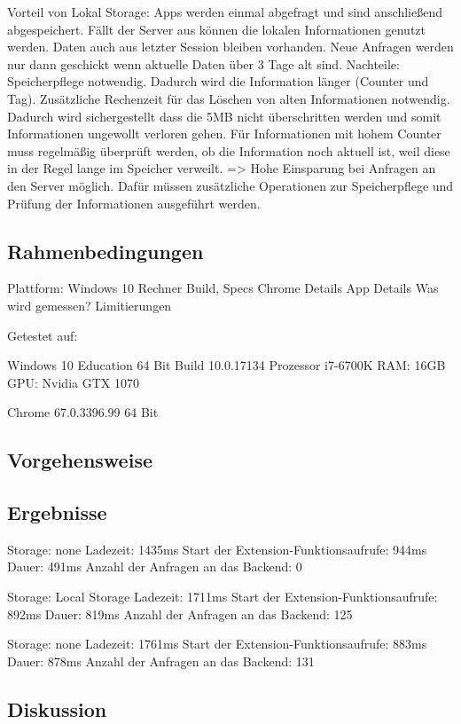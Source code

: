 Vorteil von Lokal Storage: Apps werden einmal abgefragt und sind anschließend abgespeichert. Fällt der Server aus können die lokalen Informationen genutzt werden. Daten auch aus letzter Session bleiben vorhanden. Neue Anfragen werden nur dann geschickt wenn aktuelle Daten über 3 Tage alt sind.
Nachteile: Speicherpflege notwendig. Dadurch wird die Information länger (Counter und Tag). Zusätzliche Rechenzeit für das Löschen von alten Informationen notwendig. Dadurch wird sichergestellt dass die 5MB nicht überschritten werden und somit Informationen ungewollt verloren gehen. Für Informationen mit hohem Counter muss regelmäßig überprüft werden, ob die Information noch aktuell ist, weil diese in der Regel lange im Speicher verweilt.
=> Hohe Einsparung bei Anfragen an den Server möglich. Dafür müssen zusätzliche Operationen zur Speicherpflege und Prüfung der Informationen ausgeführt werden.

\subsection{Rahmenbedingungen}
\label{ss:rahmenbedingungen}

Plattform: Windows 10 Rechner Build, Specs
Chrome Details
App Details
Was wird gemessen?
Limitierungen

Getestet auf:

Windows 10 Education 64 Bit
Build 10.0.17134
Prozessor i7-6700K
RAM: 16GB
GPU: Nvidia GTX 1070

Chrome  67.0.3396.99 64 Bit


\subsection{Vorgehensweise}
\label{ss:vorgehensweise}



\subsection{Ergebnisse}
\label{ss:ergebnisseht2}

Storage: none
Ladezeit: 1435ms
Start der Extension-Funktionsaufrufe: 944ms
Dauer: 491ms
Anzahl der Anfragen an das Backend: 0


Storage: Local Storage
Ladezeit: 1711ms
Start der Extension-Funktionsaufrufe: 892ms
Dauer: 819ms
Anzahl der Anfragen an das Backend: 125


Storage: none
Ladezeit: 1761ms
Start der Extension-Funktionsaufrufe: 883ms
Dauer: 878ms
Anzahl der Anfragen an das Backend: 131




\subsection{Diskussion}
\label{ss:diskussionht2}